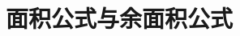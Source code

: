 \documentclass[../main.tex]{subfiles}%
\begin{document}
\chapter{面积公式与余面积公式}\label{chapter:ch03}





\end{document}
